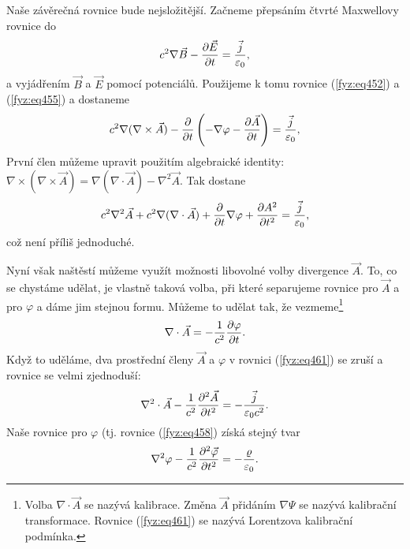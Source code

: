   Naše závěrečná rovnice bude nejsložitější. Začneme přepsáním čtvrté Maxwellovy rovnice do
  \begin{equation}\label{fyz:eq459}
    c^2\nabla\vec{B} - \dfrac{\partial \vec{E}}{\partial t} = \frac{\vec{j}}{\varepsilon_0},
  \end{equation}
  a vyjádřením \(\vec{B}\) a \(\vec{E}\) pomocí potenciálů. Použijeme k tomu rovnice 
  (\ref{fyz:eq452}) a (\ref{fyz:eq455}) a dostaneme
  \begin{equation}\label{fyz:eq460}
    c^2\nabla(\nabla\times\vec{A}) - \dfrac{\partial  }{\partial t}\left(- \nabla\varphi - \dfrac{\partial \vec{A}}{\partial t}\right) 
      = \frac{\vec{j}}{\varepsilon_0},
  \end{equation}
  První člen můžeme upravit použitím algebraické identity: \(\nabla\times(\nabla\times\vec{A}) = 
  \nabla(\nabla\cdot\vec{A})- \nabla^2\vec{A}\). Tak dostane
  \begin{equation}\label{fyz:eq461}
    c^2\nabla^2\vec{A} + c^2\nabla(\nabla\cdot\vec{A}) + \dfrac{\partial  }{\partial t}\nabla\varphi + 
    \dfrac{\partial A^2}{\partial t^2}  = \frac{\vec{j}}{\varepsilon_0},
  \end{equation}
  což není příliš jednoduché.
  
  Nyní však naštěstí můžeme využít možnosti libovolné volby divergence \(\vec{A}\). To, co se 
  chystáme udělat, je vlastně taková volba, při které separujeme rovnice pro \(\vec{A}\) a pro 
  \(\varphi\) a dáme jim stejnou formu. Můžeme to udělat tak, že vezmeme\footnote{Volba 
  \(\nabla\cdot\vec{A}\) se nazývá kalibrace. Změna \(\vec{A}\) přidáním \(\nabla\Psi\) se nazývá 
  kalibrační transformace. Rovnice (\ref{fyz:eq461}) se nazývá Lorentzova kalibrační podmínka.}
  \begin{equation}\label{fyz:eq462}
    \nabla\cdot\vec{A} = -\frac{1}{c^2}\dfrac{\partial \varphi}{\partial t}.
  \end{equation}
  Když to uděláme, dva prostřední členy \(\vec{A}\) a \(\varphi\) v rovnici (\ref{fyz:eq461}) se 
  zruší a rovnice se velmi zjednoduší: 
  \begin{equation}\label{fyz:eq463}
    \nabla^2\cdot\vec{A} - \frac{1}{c^2}\dfrac{\partial^2 \vec{A}}{\partial t^2} = - \frac{\vec{j}}{\varepsilon_0c^2}.
  \end{equation} 
  Naše rovnice pro \(\varphi\) (tj. rovnice (\ref{fyz:eq458}) získá stejný tvar
  \begin{equation}\label{fyz:eq464}
    \nabla^2\varphi - \frac{1}{c^2}\dfrac{\partial^2 \vec{\varphi}}{\partial t^2} = - \frac{\varrho}{\varepsilon_0}.
  \end{equation} 

